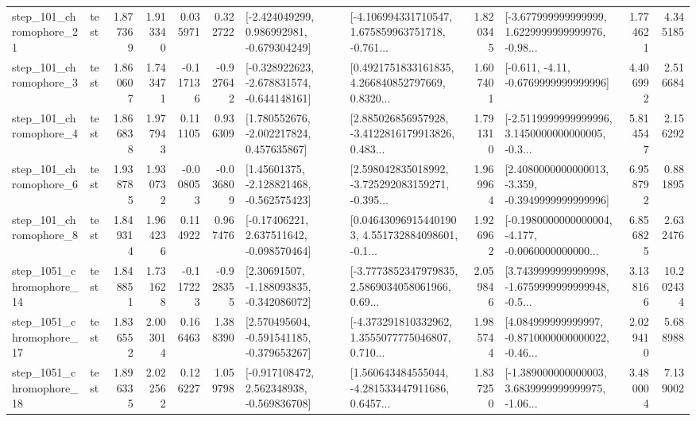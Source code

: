 \begin{tabular}{llrrrrllrlrr}
  step\_101\_chromophore\_21 &      test &      1.877369 &    1.913340 &      0.035971 &  0.322722 &   [-2.424049299, 0.986992981, -0.679304249] &  [-4.106994331710547, 1.675859963751718, -0.761... &       1.820345 &  [-3.677999999999999, 1.6229999999999976, -0.98... &            1.774621 &          4.345185 \\
   step\_101\_chromophore\_3 &      test &      1.860607 &    1.743471 &     -0.117136 & -0.927642 &  [-0.328922623, -2.678831574, -0.644148161] &  [0.4921751833161835, 4.266840852797669, 0.8320... &       1.607401 &               [-0.611, -4.11, -0.6769999999999996] &            4.406992 &          2.516684 \\
   step\_101\_chromophore\_4 &      test &      1.866838 &    1.977943 &      0.111105 &  0.936309 &    [1.780552676, -2.002217824, 0.457635867] &  [2.885026856957928, -3.4122816179913826, 0.483... &       1.791310 &  [-2.5119999999999996, 3.1450000000000005, -0.3... &            5.814547 &          2.156292 \\
   step\_101\_chromophore\_6 &      test &      1.938785 &    1.930732 &     -0.008053 & -0.036809 &    [1.45601375, -2.128821468, -0.562575423] &  [2.598042835018992, -3.725292083159271, -0.395... &       1.969964 &  [2.4080000000000013, -3.359, -0.3949999999999996] &            6.958792 &          0.881895 \\
   step\_101\_chromophore\_8 &      test &      1.849314 &    1.964236 &      0.114922 &  0.967476 &    [-0.17406221, 2.637511642, -0.098570464] &  [0.046430969154401903, 4.551732884098601, -0.1... &       1.926962 &  [-0.1980000000000004, -4.177, -0.0060000000000... &            6.856825 &          2.632476 \\
 step\_1051\_chromophore\_14 &      test &      1.848851 &    1.731628 &     -0.117223 & -0.928355 &    [2.30691507, -1.188093835, -0.342086072] &  [-3.7773852347979835, 2.5869034058061966, 0.69... &       2.059846 &  [3.7439999999999998, -1.6759999999999948, -0.5... &            3.138166 &         10.202434 \\
 step\_1051\_chromophore\_17 &      test &      1.836552 &    2.003014 &      0.166463 &  1.388390 &   [2.570495604, -0.591541185, -0.379653267] &  [-4.373291810332962, 1.3555077775046807, 0.710... &       1.985744 &  [4.084999999999997, -0.8710000000000022, -0.46... &            2.029410 &          5.688988 \\
 step\_1051\_chromophore\_18 &      test &      1.896335 &    2.022562 &      0.126227 &  1.059798 &   [-0.917108472, 2.562348938, -0.569836708] &  [1.560643484555044, -4.281533447911686, 0.6457... &       1.837250 &  [-1.389000000000003, 3.6839999999999975, -1.06... &            3.480004 &          7.139002 \\

\end{tabular}
